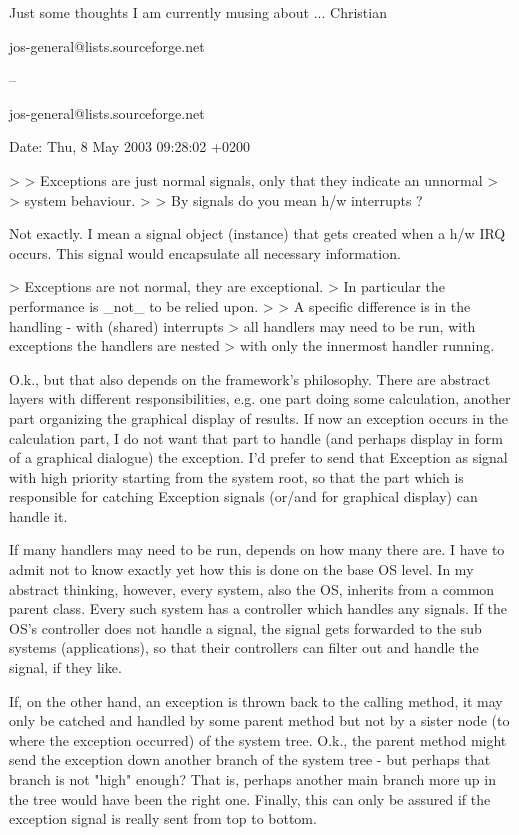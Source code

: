 Just some thoughts I am currently musing about ...
Christian

jos-general@lists.sourceforge.net

--

jos-general@lists.sourceforge.net

Date:
Thu, 8 May 2003 09:28:02 +0200

> > Exceptions are just normal signals, only that they indicate an unnormal
> > system behaviour.
>
> By signals do you mean h/w interrupts ?

Not exactly. I mean a signal object (instance) that gets created when a
h/w IRQ occurs. This signal would encapsulate all necessary information.

> Exceptions are not normal, they are exceptional.
> In particular the performance is _not_ to be relied upon.
>
> A specific difference is in the handling - with (shared) interrupts
> all handlers may need to be run, with exceptions the handlers are nested
> with only the innermost handler running.

O.k., but that also depends on the framework's philosophy. There are
abstract layers with different responsibilities, e.g. one part doing some
calculation, another part organizing the graphical display of results.
If now an exception occurs in the calculation part, I do not want that
part to handle (and perhaps display in form of a graphical dialogue) the
exception. I'd prefer to send that Exception as signal with high priority
starting from the system root, so that the part which is responsible for
catching Exception signals (or/and for graphical display) can handle it.

If many handlers may need to be run, depends on how many there are.
I have to admit not to know exactly yet how this is done on the base
OS level. In my abstract thinking, however, every system, also the OS,
inherits from a common parent class. Every such system has a controller
which handles any signals. If the OS's controller does not handle a
signal, the signal gets forwarded to the sub systems (applications),
so that their controllers can filter out and handle the signal, if they
like.

If, on the other hand, an exception is thrown back to the calling method,
it may only be catched and handled by some parent method but not by
a sister node (to where the exception occurred) of the system tree.
O.k., the parent method might send the exception down another branch
of the system tree - but perhaps that branch is not "high" enough?
That is, perhaps another main branch more up in the tree would have
been the right one. Finally, this can only be assured if the exception
signal is really sent from top to bottom.

